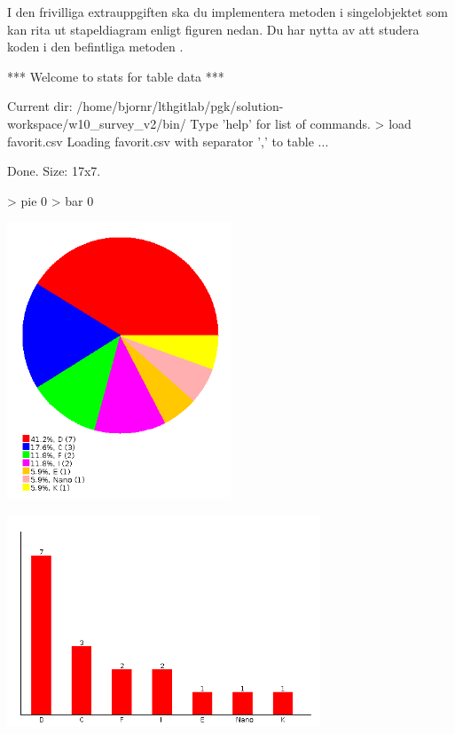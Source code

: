 I den frivilliga extrauppgiften ska du implementera metoden  i singelobjektet  som kan rita ut stapeldiagram enligt figuren nedan. Du har nytta av att studera koden i den befintliga metoden .
\begin{REPLnonum}
*** Welcome to stats for table data ***

Current dir: /home/bjornr/lthgitlab/pgk/solution-workspace/w10_survey_v2/bin/
Type 'help' for list of commands.
> load favorit.csv
Loading favorit.csv
  with separator ',' to table ...

Done. Size: 17x7.

> pie 0
> bar 0
\end{REPLnonum}

\includegraphics[width=0.5\textwidth]{../img/survey/pie.png}

\includegraphics[width=0.7\textwidth]{../img/survey/bar.png}

